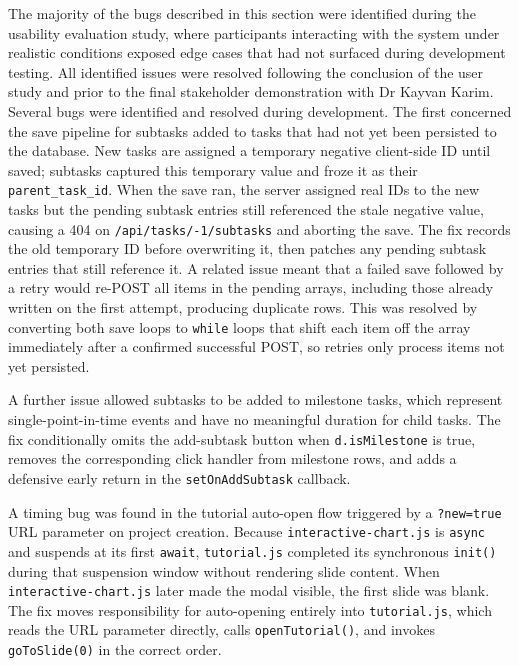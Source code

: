 \documentclass[12pt,nonacm,acmlarge,titlepage,screen]{acmart}
\begin{document}
The majority of the bugs described in this section were identified during the 
usability evaluation study, where participants interacting with the system under 
realistic conditions exposed edge cases that had not surfaced during development 
testing. All identified issues were resolved following the conclusion of the user 
study and prior to the final stakeholder demonstration with Dr Kayvan Karim.
Several bugs were identified and resolved during development. The first concerned 
the save pipeline for subtasks added to tasks that had not yet been persisted to the 
database. New tasks are assigned a temporary negative client-side ID until saved; 
subtasks captured this temporary value and froze it as their \texttt{parent\_task\_id}. 
When the save ran, the server assigned real IDs to the new tasks but the pending 
subtask entries still referenced the stale negative value, causing a 404 on 
\texttt{/api/tasks/-1/subtasks} and aborting the save. The fix records the old 
temporary ID before overwriting it, then patches any pending subtask entries that 
still reference it. A related issue meant that a failed save followed by a retry 
would re-POST all items in the pending arrays, including those already written on 
the first attempt, producing duplicate rows. This was resolved by converting both 
save loops to \texttt{while} loops that shift each item off the array immediately 
after a confirmed successful POST, so retries only process items not yet persisted.

A further issue allowed subtasks to be added to milestone tasks, which represent 
single-point-in-time events and have no meaningful duration for child tasks. The fix 
conditionally omits the add-subtask button when \texttt{d.isMilestone} is true, 
removes the corresponding click handler from milestone rows, and adds a defensive 
early return in the \texttt{setOnAddSubtask} callback.

A timing bug was found in the tutorial auto-open flow triggered by a 
\texttt{?new=true} URL parameter on project creation. Because 
\texttt{interactive-chart.js} is \texttt{async} and suspends at its first 
\texttt{await}, \texttt{tutorial.js} completed its synchronous \texttt{init()} 
during that suspension window without rendering slide content. When 
\texttt{interactive-chart.js} later made the modal visible, the first slide was 
blank. The fix moves responsibility for auto-opening entirely into 
\texttt{tutorial.js}, which reads the URL parameter directly, calls 
\texttt{openTutorial()}, and invokes \texttt{goToSlide(0)} in the correct order.
\end{document}
